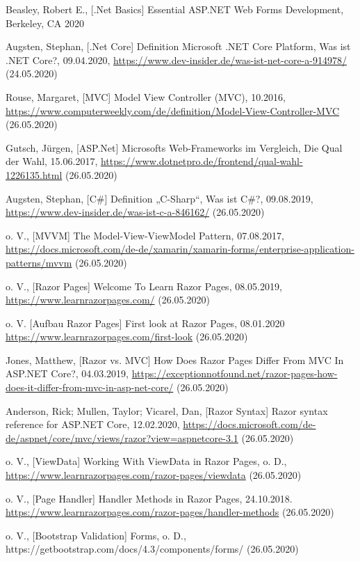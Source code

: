 \documentclass[a4paper,
12pt,
oneside]
{article}
\begin{document}
	\thispagestyle{empty}
	\nocite{*}
	\begin{thebibliography}{}
		 Beasley, Robert E., [.Net Basics] Essential ASP.NET Web Forms Development, Berkeley, CA 2020 
		
		 Augsten, Stephan, [.Net Core] Definition \glqq Microsoft .NET Core Platform\grqq, Was ist .NET Core?, 09.04.2020, \url{https://www.dev-insider.de/was-ist-net-core-a-914978/} (24.05.2020)
		
		 Rouse, Margaret, [MVC] Model View Controller (MVC), 10.2016, \url{https://www.computerweekly.com/de/definition/Model-View-Controller-MVC} (26.05.2020)
		
		 Gutsch, Jürgen, [ASP.Net] Microsofts Web-Frameworks im Vergleich, Die Qual der Wahl, 15.06.2017, \url{https://www.dotnetpro.de/frontend/qual-wahl-1226135.html} (26.05.2020)
		
		 Augsten, Stephan, [C\#] Definition „C-Sharp“, Was ist C\#?, 09.08.2019, \url{https://www.dev-insider.de/was-ist-c-a-846162/} (26.05.2020)
		
		 o. V., [MVVM] The Model-View-ViewModel Pattern, 07.08.2017, \url{https://docs.microsoft.com/de-de/xamarin/xamarin-forms/enterprise-application-patterns/mvvm} (26.05.2020)
		
		 o. V., [Razor Pages] Welcome To Learn Razor Pages, 08.05.2019, \url{https://www.learnrazorpages.com/} (26.05.2020)
		
		 o. V. [Aufbau Razor Pages] First look at Razor Pages, 08.01.2020 \url{https://www.learnrazorpages.com/first-look} (26.05.2020)
		
		 Jones, Matthew, [Razor vs. MVC] How Does Razor Pages Differ From MVC In ASP.NET Core?, 04.03.2019, \url{https://exceptionnotfound.net/razor-pages-how-does-it-differ-from-mvc-in-asp-net-core/} (26.05.2020)
		
		 Anderson, Rick; Mullen, Taylor; Vicarel, Dan, [Razor Syntax] Razor syntax reference for ASP.NET Core, 12.02.2020, \url{https://docs.microsoft.com/de-de/aspnet/core/mvc/views/razor?view=aspnetcore-3.1} (26.05.2020)
		
		 o. V., [ViewData] Working With ViewData in Razor Pages, o. D., \url{https://www.learnrazorpages.com/razor-pages/viewdata} (26.05.2020)
		
		 o. V., [Page Handler] Handler Methods in Razor Pages, 24.10.2018. \url{https://www.learnrazorpages.com/razor-pages/handler-methods} (26.05.2020)
		
		 o. V., [Bootstrap Validation] Forms, o. D., https://getbootstrap.com/docs/4.3/components/forms/ (26.05.2020)
	\end{thebibliography}
	\clearpage
	
\end{document}
